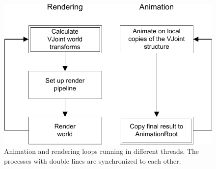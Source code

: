 \documentclass[11pt]{article}
\begin{document}
\begin{figure}
\includegraphics{threads-crop}
\caption{\label{threads}Animation and rendering loops running in different threads. The processes with double lines are synchronized to each other.}
\end{figure}
\end{document}
